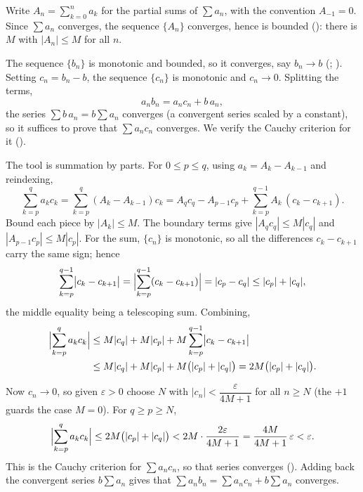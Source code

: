 \documentclass[main.tex]{subfiles}
\begin{document}
\begin{SolutionBlue}
Write $A_{n}=\sum_{k=0}^{n}a_{k}$ for the partial sums of $\sum a_{n}$, with the convention
$A_{-1}=0$. Since $\sum a_{n}$ converges, the sequence $\{A_{n}\}$ converges, hence is bounded
(): there is $M$ with $|A_{n}|\le M$ for all
$n$.

The sequence $\{b_{n}\}$ is monotonic and bounded, so it converges, say $b_{n}\to b$
(; ). Setting
$c_{n}=b_{n}-b$, the sequence $\{c_{n}\}$ is monotonic and $c_{n}\to 0$. Splitting the terms,
\[
a_{n}b_{n}=a_{n}c_{n}+b\,a_{n},
\]
the series $\sum b\,a_{n}=b\sum a_{n}$ converges (a convergent series scaled by a constant), so it
suffices to prove that $\sum a_{n}c_{n}$ converges. We verify the Cauchy criterion for it
().

The tool is summation by parts. For $0\le p\le q$, using $a_{k}=A_{k}-A_{k-1}$ and reindexing,
\[
\sum_{k=p}^{q}a_{k}c_{k}
=\sum_{k=p}^{q}(A_{k}-A_{k-1})c_{k}
=A_{q}c_{q}-A_{p-1}c_{p}+\sum_{k=p}^{q-1}A_{k}\,(c_{k}-c_{k+1}).
\]
Bound each piece by $|A_{k}|\le M$. The boundary terms give $|A_{q}c_{q}|\le M|c_{q}|$ and
$|A_{p-1}c_{p}|\le M|c_{p}|$. For the sum, $\{c_{n}\}$ is monotonic, so all the differences
$c_{k}-c_{k+1}$ carry the same sign; hence
\[
\sum_{k=p}^{q-1}\bigl|c_{k}-c_{k+1}\bigr|
=\Bigl|\sum_{k=p}^{q-1}(c_{k}-c_{k+1})\Bigr|
=|c_{p}-c_{q}|\le |c_{p}|+|c_{q}|,
\]
the middle equality being a telescoping sum. Combining,
\[
\begin{aligned}
\Bigl|\sum_{k=p}^{q}a_{k}c_{k}\Bigr|
&\le M|c_{q}|+M|c_{p}|+M\sum_{k=p}^{q-1}\bigl|c_{k}-c_{k+1}\bigr|\\
&\le M|c_{q}|+M|c_{p}|+M\bigl(|c_{p}|+|c_{q}|\bigr)
=2M\bigl(|c_{p}|+|c_{q}|\bigr).
\end{aligned}
\]

Now $c_{n}\to 0$, so given $\varepsilon>0$ choose $N$ with $|c_{n}|<\dfrac{\varepsilon}{4M+1}$ for all
$n\ge N$ (the $+1$ guards the case $M=0$). For $q\ge p\ge N$,
\[
\Bigl|\sum_{k=p}^{q}a_{k}c_{k}\Bigr|\le 2M\bigl(|c_{p}|+|c_{q}|\bigr)<2M\cdot\frac{2\varepsilon}{4M+1}
=\frac{4M}{4M+1}\,\varepsilon<\varepsilon.
\]
This is the Cauchy criterion for $\sum a_{n}c_{n}$, so that series converges (). Adding
back the convergent series $b\sum a_{n}$ gives that $\sum a_{n}b_{n}=\sum a_{n}c_{n}+b\sum a_{n}$
converges.
\end{SolutionBlue}
\end{document}
